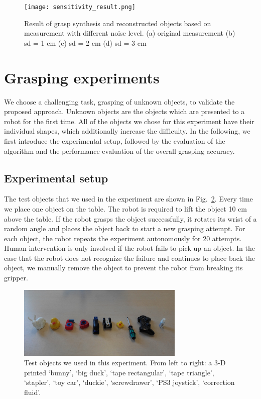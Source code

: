 \begin{figure}[!htbp] 
\centering
\texttt{[image: sensitivity\_result.png]}%
\caption{Result of grasp synthesis and reconstructed objects based on measurement with different noise level. (a) original measurement (b) sd = 1 cm (c) sd = 2 cm (d) sd = 3 cm}
\label{fig:grasp_synthesis_sensitivity}
\end{figure}	



\section{Grasping experiments}
We choose a challenging task, grasping of unknown objects, to validate the proposed approach. Unknown objects are the objects which are presented to a robot for the first time. All of the objects we chose for this experiment have their individual shapes, which additionally increase the difficulty. In the following, we first introduce the experimental setup, followed by the evaluation of the algorithm and the performance evaluation of the overall grasping accuracy. 

\subsection{Experimental setup}
The test objects that we used in the experiment are shown in Fig.~\ref{fig:test_objects}. Every time we place one object on the table. The robot is required to lift the object 10 cm above the table. If the robot grasps the object successfully, it rotates its wrist of a random angle and places the object back to start a new grasping attempt. For each object, the robot repeats the experiment autonomously for 20 attempts. Human intervention is only involved if the robot fails to pick up an object. In the case that the robot does not recognize the failure and continues to place back the object,  we manually remove the object to prevent the robot from breaking its gripper.  

\begin{figure}[!htbp] 
\centering
\includegraphics[width=0.7\linewidth]
{figure/test_object.png}%
\caption{Test objects we used in this experiment. From left to right: a 3-D printed `bunny', `big duck', `tape rectangular', `tape triangle', `stapler', `toy car', `duckie', `screwdrawer', `PS3 joystick', `correction fluid'. }
\label{fig:test_objects}
\end{figure}	
   
